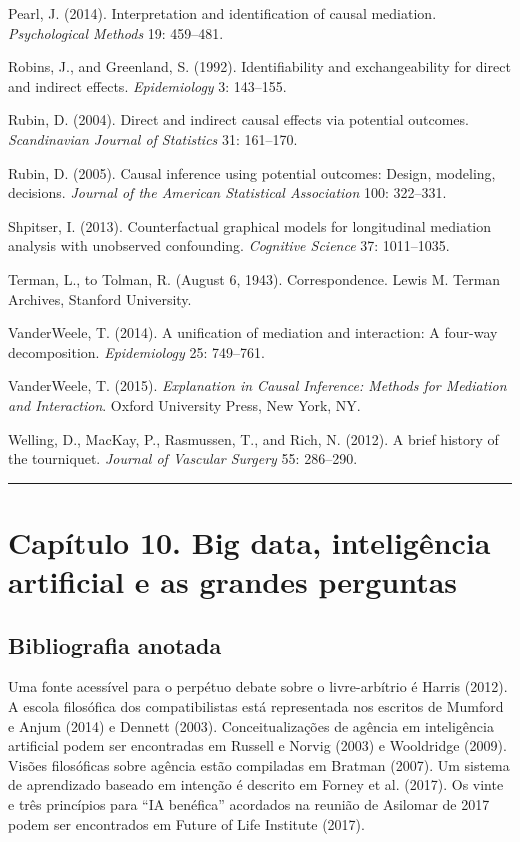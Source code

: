 \documentclass[11pt,a5paper,twoside]{book}
\begin{document}
Pearl, J. (2014). Interpretation and identification of causal mediation. \textit{Psychological Methods} 19: 459–481.

Robins, J., and Greenland, S. (1992). Identifiability and exchangeability for direct and indirect effects. \textit{Epidemiology} 3: 143–155.

Rubin, D. (2004). Direct and indirect causal effects via potential outcomes. \textit{Scandinavian Journal of Statistics} 31: 161–170.

Rubin, D. (2005). Causal inference using potential outcomes: Design, modeling, decisions. \textit{Journal of the American Statistical Association} 100: 322–331.

Shpitser, I. (2013). Counterfactual graphical models for longitudinal mediation analysis with unobserved confounding. \textit{Cognitive Science} 37: 1011–1035.

Terman, L., to Tolman, R. (August 6, 1943). Correspondence. Lewis M. Terman Archives, Stanford University.

VanderWeele, T. (2014). A unification of mediation and interaction: A four-way decomposition. \textit{Epidemiology} 25: 749–761.

VanderWeele, T. (2015). \textit{Explanation in Causal Inference: Methods for Mediation and Interaction}. Oxford University Press, New York, NY.

Welling, D., MacKay, P., Rasmussen, T., and Rich, N. (2012). A brief history of the tourniquet. \textit{Journal of Vascular Surgery} 55: 286–290.

\vspace{1em}\hrule\vspace{1em}
\section{Capítulo 10. Big data, inteligência artificial e as grandes perguntas}
\subsection{Bibliografia anotada}
Uma fonte acessível para o perpétuo debate sobre o livre-arbítrio é Harris (2012). A escola filosófica dos compatibilistas está representada nos escritos de Mumford e Anjum (2014) e Dennett (2003). Conceitualizações de agência em inteligência artificial podem ser encontradas em Russell e Norvig (2003) e Wooldridge (2009). Visões filosóficas sobre agência estão compiladas em Bratman (2007). Um sistema de aprendizado baseado em intenção é descrito em Forney et al. (2017). Os vinte e três princípios para “IA benéfica” acordados na reunião de Asilomar de 2017 podem ser encontrados em Future of Life Institute (2017).
\end{document}
